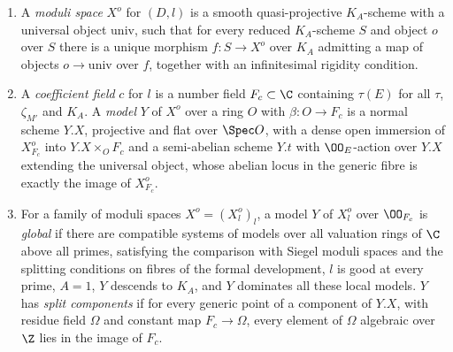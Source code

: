 \begin{enumerate}[label=(\alph*)]
  and a level-$A$ structure $\eta_A$ (homomorphisms on $\Lambda$ killing $\mathfrak M\Lambda$, resp.\
  $A\Lambda$), satisfying the determinant condition of signature $(p,q)$ and the existence, at geometric
  points, of a Tate isomorphism compatible with the Weil pairings and the level structures. A \emph{map
  of objects} over $f\colon S'\to S$ is a cartesian $\OO_E$-equivariant morphism of the semi-abelian
  schemes over $f$, compatible with the cubical structures and with $\eta$, $\eta_A$.
\item A \emph{moduli space} $X^o$ for $(D,l)$ is a smooth quasi-projective $K_A$-scheme with a universal
  object $\mathrm{univ}$, such that for every reduced $K_A$-scheme $S$ and object $o$ over $S$ there is a
  unique morphism $f\colon S\to X^o$ over $K_A$ admitting a map of objects $o\to\mathrm{univ}$ over $f$,
  together with an infinitesimal rigidity condition.
\item A \emph{coefficient field} $c$ for $l$ is a number field $F_c\subset\C$ containing $\tau(E)$ for all
  $\tau$, $\zeta_{M'}$ and $K_A$. A \emph{model} $Y$ of $X^o$ over a ring $O$ with $\beta\colon O\to F_c$ is
  a normal scheme $Y.X$, projective and flat over $\Spec O$, with a dense open immersion of $X^o_{F_c}$
  into $Y.X\times_OF_c$ and a semi-abelian scheme $Y.t$ with $\OO_E$-action over $Y.X$ extending the
  universal object, whose abelian locus in the generic fibre is exactly the image of $X^o_{F_c}$.
\item For a family of moduli spaces $X^o=(X^o_l)_l$, a model $Y$ of $X^o_l$ over $\OO_{F_c}$ is
  \emph{global} if there are compatible systems of models over all valuation rings of $\C$ above all
  primes, satisfying the comparison with Siegel moduli spaces and the splitting conditions on fibres of
  the formal development, $l$ is good at every prime, $A=1$, $Y$ descends to $K_A$, and $Y$ dominates all
  these local models. $Y$ has \emph{split components} if for every generic point of a component of $Y.X$,
  with residue field $\Omega$ and constant map $F_c\to\Omega$, every element of $\Omega$ algebraic over
  $\Z$ lies in the image of $F_c$.
\end{enumerate}

